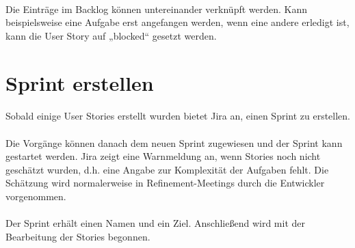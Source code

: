 \documentclass{article}
\begin{document}
\paragraph{}
Die Einträge im Backlog können untereinander verknüpft werden. Kann beispielsweise eine Aufgabe erst angefangen werden, wenn eine andere erledigt ist, kann die User Story auf „blocked“ gesetzt werden.

\section{Sprint erstellen}
\paragraph{}
Sobald einige User Stories erstellt wurden bietet Jira an, einen Sprint zu erstellen.

\begin{figure}[h]
  \centering
  \label{}
\end{figure}

\paragraph{}
Die Vorgänge können danach dem neuen Sprint zugewiesen und der Sprint kann gestartet werden. Jira zeigt eine Warnmeldung an, wenn Stories noch nicht geschätzt wurden, d.h. eine Angabe zur Komplexität der Aufgaben fehlt. Die Schätzung wird normalerweise in Refinement-Meetings durch die Entwickler vorgenommen.

\paragraph{}
Der Sprint erhält einen Namen und ein Ziel. Anschließend wird mit der Bearbeitung der Stories begonnen.

\begin{figure}[h]
  \centering
  \label{}
\end{figure}
\end{document}
